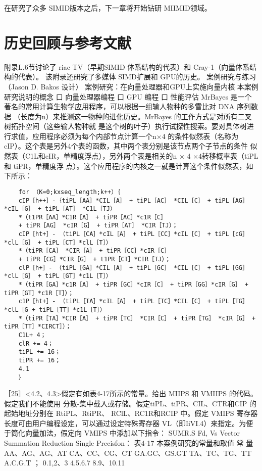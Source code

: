 在研究了众多 SIMID版本之后，下一章将开始钻研 MIIMID领域。
\section{历史回顾与参考文献}
附录L.6节讨论了 riac TV（早期SIMID 体系结构的代表）和 Cray-1（向量体系结构的代表）。
该附录还研究了多媒体 SIMD扩展和 GPU的历史。
案例研究与练习（Jason D. Bakos 设计）
案例研究：在向量处理器和GPU上实施向量内核
本案例研究说明的概念
口 向量处理器编程
口 GPU 编程
口 性能评估
MrBayes 是一个著名的常用计算生物学应用程序，可以根据一组输人物种的多雪比对 DNA 序列数据
（长度为n）来推测这一物种的进化历史。MrBayes 的工作方式是对所有二叉树拓扑空间（这些输人物种就
是这个树的叶子）执行试探性搜索。要对具体树进行求值，应用程序必须为每个内部节点计算一个n×4
的条件似然表（名称为cIP）。这个表是另外4个表的函数，其中两个表分别是该节点两个子节点的条件
似然表（C1L和cIR，单精度浮点），另外两个表是相关的n × 4 ×4转移概率表（tiPL 和 tiPR，单精度浮
点）。这个应用程序的内核之一就是计算这个条件似然表，如下所示：
\begin{verbatim}
    for （K=0;kxseq_length;k++）｛
    cIP［h++］-｛tiPL［AA］*CIL［A］ + tiPL［AC］ *CIL［C］ + tiPL［AG］*cIL［G］ + tiPL［AT］ *C1L［TJ）
    *（t1PR［AA］*C1R［A］ + tiPR［AC］*c1R［C］
    + tiPR［AG］ *cIR［G］ + tiPR［AT］ *CIR［TJ）；
    cIP［ht+］- （tiPL［CA］*cIL［A］ + tiPL［CC］*cIL［C］ + tiPL［cG］ *clL［G］ + tiPL［CT］*clL［T］）
    *（tiPR［CA］ *CIR［A］ + tiPR［CC］*cIR［C］
    + tiPR［CG］*CIR［G］ + t1PR［CT］*CIR［TJ）；
    clP［h+］- （tiPL［GA］*CIL［A］ + tiPL［GC］ *CIL［C］ + tiPL［GG］*clL［G］ + tiPL［GT］*c1L［T］）
    *（tiPR［GA］*c1R［A］ + tiPR［GC］*cIR［C］ + tiPR［GG］*cIR［G］ + tiPR［GT］*c1R［T］）；
    c1P［ht+］- （tiPL［TA］*cIL［A］ + tiPL［TC］*CIL［C］ + tiPL［TG］*clL［G + tiPL［TT］*c1L［T］）
    *（tiPR［TA］*CIR［A］ + tiPR［TC］ *CIR［C］ + tiPR［TG］ *cIR［G］ + tiPR［TT］*CIRCT］）；
    C1L+ 4；
    clR += 4；
    tiPL += 16；
    tiPR += 16；
    4.1
    ｝
\end{verbatim}
［25］<4.2、4.3>假定有如表4-17所示的常量。给出 MIIPS 和 VMIIPS 的代码。假定我们不能使用
分散-集中载入或存储。假定tiPL、tiPR、CIL、CTR和CIP 的起始地址分别在 RtiPL、RtiPR、
RClL、RC1R和RCIP 中。假定 VMIPS 寄存器长度可由用户编程设定，可以通过设定特殊寄存器
VL（即IiVI.4）来指定。为便于筒化向量加法，假定向 VMIPS 中添加以下指令：
SUMR.S Fd, Vs Vector Summation Reduction Single Precisfon：
表4-17 本案例研究的常量和取值
常
量
AA、AG、AG、AT
CA、CC、CG、CT
GA.GC、GS.GT
TA、TC、TG、TT
A.C.G.T
；
0.1,2、3
4.5.6.7
8.9、10.11

